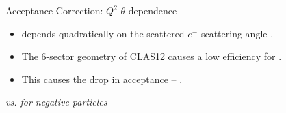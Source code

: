 \begin{frame}{Acceptance Correction: $Q^2$ $\theta$ dependence}
    \label{11.53::q2_theta_dependence}

    \begin{itemize}
        \item
             depends quadratically on the scattered $e^-$ scattering angle .

        \item
            The 6-sector geometry of CLAS12 causes a low efficiency for .

        \item
            This causes the drop in acceptance -- .
    \end{itemize}

    \begin{center}
        \begin{figure}[t]
        \end{figure}
        \scriptsize{\textit{\ef{$\varphi$} vs. \ef{$\theta$} for negative particles}}
    \end{center}
\end{frame}


